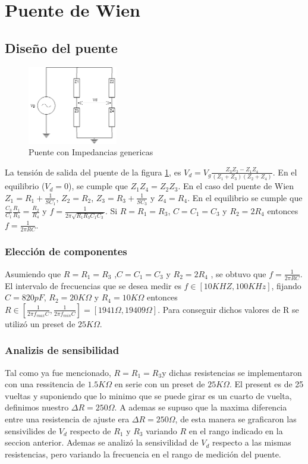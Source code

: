 \documentclass[../../main.tex]{subfiles}
\begin{document}
\section{Puente de Wien}

\subsection{Diseño del puente}
\begin{figure}[H]	
	\centering
	\includegraphics[width=0.35\textwidth]{fotos/PuenteGen.png}
	\caption{Puente con Impedancias genericas} \label{fig:pg}
\end{figure}
La tensión de salida del puente de la figura \ref{fig:pg}, es $V_d=V_g \frac{Z_3 Z_2 - Z_1 Z_4}{(Z_1 + Z_3)(Z_2 + Z_4)}$. En el equilibrio ($V_d=0$), se cumple que $Z_1 Z_4 = Z_2 Z_3$. En el caso del puente de Wien $Z_1=R_1 + \frac{1}{SC_1}$, $Z_2=R_2$, $Z_3=R_3 +  \frac{1}{SC_3}$ y $Z_4=R_4$. En el equilibrio se cumple que $\frac{C_3}{C_1} \frac{R_1}{R_3}= \frac {R_2}{R_4}$ y $f=\frac{1}{2 \pi \sqrt{R_1 R_3 C_1 C_3} }$. Si $R=R_1=R_3$, $C=C_1=C_3$ y $R_2=2 R_4$ entonces $f=\frac{1}{2 \pi RC}$.

\subsubsection{Elección de componentes}
Asumiendo que  $R=R_1=R_3$ ,$C=C_1=C_3$ y $R_2=2 R_4$ , se obtuvo que  $f=\frac{1}{2 \pi RC}$. El intervalo de frecuencias que se desea medir es $f \in [10KHZ , 100KHz]$, fijando $C=820pF$, $R_2=20K\Omega$ y $R_4=10K\Omega$  entonces $R \in \left[ \frac{1}{2 \pi f_{max} C} , \frac{1}{2 \pi f_{min} C} \right]=\left[ 1941 \Omega , 19409 \Omega \right]$. Para conseguir dichos valores de R se utilizó un preset de $25K\Omega $.

\subsubsection{Analizis de sensibilidad}
Tal como ya fue mencionado, $R=R_1=R_3$y dichas resistencias se implementaron con una ressitencia de $1.5K\Omega$ en serie con un preset de $25K\Omega$. El present es de 25 vueltas y suponiendo que lo minimo que se puede girar es un cuarto de vuelta, definimos nuestro $\Delta R=250\Omega$. A ademas se supuso que la maxima diferencia entre una resistencia de ajuste era $\Delta R=250\Omega$, de esta manera se graficaron las sensivilides de $V_d$ respecto de $R_1$ y $R_3$ variando $R$ en el rango indicado en la seccion anterior. Ademas se analizó la sensivilidad de $V_d$ respecto a las mismas resistencias, pero variando la frecuencia en el rango de medición del puente.
\end{document}
